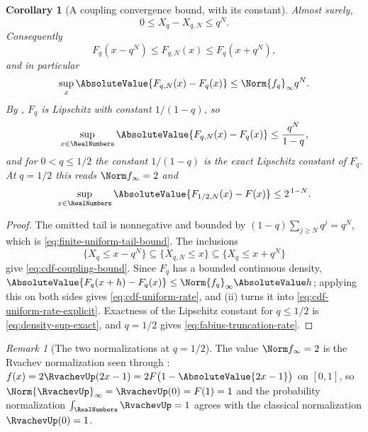 \documentclass[11pt,a4paper,oneside,openany]{book}
\newtheorem{corollary}[corollary]{Corollary}
\theoremstyle{definition}
\theoremstyle{remark}
\newtheorem{remark}[remark]{Remark}
\begin{document}
\begin{corollary}[A coupling convergence bound, with its constant]\label{cor:finite-uniform-convergence}
Almost surely,
\begin{equation}\label{eq:finite-uniform-tail-bound}
 0\le X_q-X_{q,N}\le q^N.
\end{equation}
Consequently
\begin{equation}\label{eq:cdf-coupling-bound}
 F_q(x-q^N)\le F_{q,N}(x)\le F_q(x+q^N),
\end{equation}
and in particular
\begin{equation}\label{eq:cdf-uniform-rate}
 \sup_x\AbsoluteValue{F_{q,N}(x)-F_q(x)}\le\Norm{f_q}_\infty q^N .
\end{equation}
By , $F_q$ is Lipschitz with constant
$1/(1-q)$, so
\begin{equation}\label{eq:cdf-uniform-rate-explicit}
 \sup_{x\in\RealNumbers}\AbsoluteValue{F_{q,N}(x)-F_q(x)}\le\frac{q^N}{1-q},
\end{equation}
and for $0<q\le1/2$ the constant $1/(1-q)$ is the exact Lipschitz constant of $F_q$.  At
$q=1/2$ this reads $\Norm f_\infty=2$ and
\begin{equation}\label{eq:fabius-truncation-rate}
 \sup_{x\in\RealNumbers}\AbsoluteValue{F_{1/2,N}(x)-F(x)}\le2^{\,1-N}.
\end{equation}
\end{corollary}

\begin{proof}
The omitted tail is nonnegative and bounded by $(1-q)\sum_{j\ge N}q^j=q^N$, which is
\eqref{eq:finite-uniform-tail-bound}.  The inclusions
\[
 \{X_q\le x-q^N\}\subseteq\{X_{q,N}\le x\}\subseteq\{X_q\le x+q^N\}
\]
give \eqref{eq:cdf-coupling-bound}.  Since $F_q$ has a bounded continuous density,
$\AbsoluteValue{F_q(x+h)-F_q(x)}\le\Norm{f_q}_\infty\AbsoluteValue h$; applying this on both sides gives
\eqref{eq:cdf-uniform-rate}, and
(ii) turns it into
\eqref{eq:cdf-uniform-rate-explicit}.  Exactness of the Lipschitz constant for
$q\le1/2$ is \eqref{eq:density-sup-exact}, and $q=1/2$ gives
\eqref{eq:fabius-truncation-rate}.
\end{proof}

\begin{remark}[The two normalizations at $q=1/2$]\label{rem:halfbase-density-normalizations}
The value $\Norm f_\infty=2$ is the Rvachev normalization seen through
: $f(x)=2\RvachevUp(2x-1)=2F\bigl(1-\AbsoluteValue{2x-1}\bigr)$ on
$[0,1]$, so $\Norm{\RvachevUp}_\infty=\RvachevUp(0)=F(1)=1$ and the
probability normalization $\int_\RealNumbers\RvachevUp=1$ agrees with the classical
normalization $\RvachevUp(0)=1$.
\end{remark}
\end{document}
